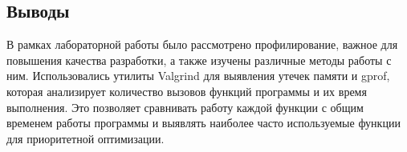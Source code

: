 \documentclass[pdf, unicode, 12pt, a4paper,oneside,fleqn]{article}
\begin{document}
\subsection*{Выводы}
В рамках лабораторной работы было рассмотрено профилирование, важное для повышения качества разработки, а также изучены различные методы работы с ним. Использовались утилиты Valgrind для выявления утечек памяти и gprof, которая анализирует количество вызовов функций программы и их время выполнения. Это позволяет сравнивать работу каждой функции с общим временем работы программы и выявлять наиболее часто используемые функции для приоритетной оптимизации.
\end{document}
